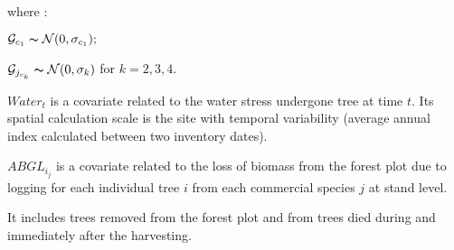\documentclass[review]{elsarticle}
\begin{document}
\noindent where : %

 $\mathcal{G}_{c_{1}} \thicksim \mathcal{N}(0,\sigma_{c_{1}});$ 
 
 $\mathcal{G}_{j_{c_{k}}} \thicksim \mathcal{N}(0,\sigma_{k})$ for $k = 2,3,4.$



\noindent $Water_{t}$ is a covariate related to the water stress undergone tree at time $t.$ Its spatial calculation scale is the site with temporal variability (average annual index calculated between two inventory dates).
 


\noindent  $ABGL_{i_{j}}$ is a covariate related to the loss of biomass from the forest plot due to logging for each individual tree $i$ from each commercial species $j$ at stand level. 


It includes trees removed from the forest plot and from trees died during and immediately after the harvesting. %


\end{document}
